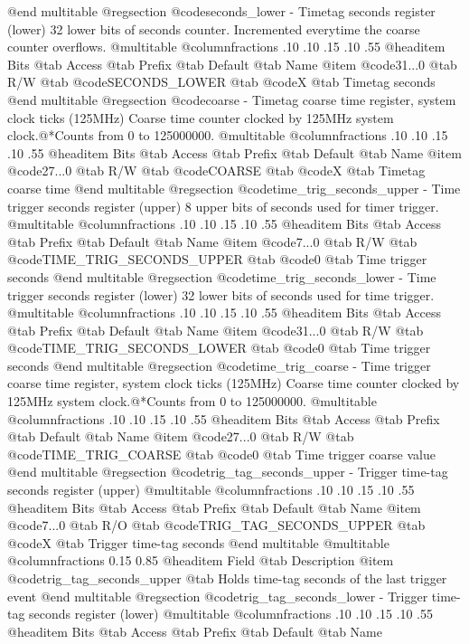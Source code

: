 @end multitable
@regsection @code{seconds_lower} - Timetag seconds register (lower)
32 lower bits of seconds counter. Incremented everytime the coarse counter overflows.
@multitable @columnfractions .10 .10 .15 .10 .55
@headitem Bits @tab Access @tab Prefix @tab Default @tab Name
@item @code{31...0}
@tab R/W @tab
@code{SECONDS_LOWER}
@tab @code{X} @tab 
Timetag seconds
@end multitable
@regsection @code{coarse} - Timetag coarse time register, system clock ticks (125MHz)
Coarse time counter clocked by 125MHz system clock.@*Counts from 0 to 125000000.
@multitable @columnfractions .10 .10 .15 .10 .55
@headitem Bits @tab Access @tab Prefix @tab Default @tab Name
@item @code{27...0}
@tab R/W @tab
@code{COARSE}
@tab @code{X} @tab 
Timetag coarse time
@end multitable
@regsection @code{time_trig_seconds_upper} - Time trigger seconds register (upper)
8 upper bits of seconds used for timer trigger.
@multitable @columnfractions .10 .10 .15 .10 .55
@headitem Bits @tab Access @tab Prefix @tab Default @tab Name
@item @code{7...0}
@tab R/W @tab
@code{TIME_TRIG_SECONDS_UPPER}
@tab @code{0} @tab 
Time trigger seconds
@end multitable
@regsection @code{time_trig_seconds_lower} - Time trigger seconds register (lower)
32 lower bits of seconds used for time trigger.
@multitable @columnfractions .10 .10 .15 .10 .55
@headitem Bits @tab Access @tab Prefix @tab Default @tab Name
@item @code{31...0}
@tab R/W @tab
@code{TIME_TRIG_SECONDS_LOWER}
@tab @code{0} @tab 
Time trigger seconds
@end multitable
@regsection @code{time_trig_coarse} - Time trigger coarse time register, system clock ticks (125MHz)
Coarse time counter clocked by 125MHz system clock.@*Counts from 0 to 125000000.
@multitable @columnfractions .10 .10 .15 .10 .55
@headitem Bits @tab Access @tab Prefix @tab Default @tab Name
@item @code{27...0}
@tab R/W @tab
@code{TIME_TRIG_COARSE}
@tab @code{0} @tab 
Time trigger coarse value
@end multitable
@regsection @code{trig_tag_seconds_upper} - Trigger time-tag seconds register (upper)
@multitable @columnfractions .10 .10 .15 .10 .55
@headitem Bits @tab Access @tab Prefix @tab Default @tab Name
@item @code{7...0}
@tab R/O @tab
@code{TRIG_TAG_SECONDS_UPPER}
@tab @code{X} @tab 
Trigger time-tag seconds
@end multitable
@multitable @columnfractions 0.15 0.85
@headitem Field @tab Description
@item @code{trig_tag_seconds_upper} @tab Holds time-tag seconds of the last trigger event
@end multitable
@regsection @code{trig_tag_seconds_lower} - Trigger time-tag seconds register (lower)
@multitable @columnfractions .10 .10 .15 .10 .55
@headitem Bits @tab Access @tab Prefix @tab Default @tab Name
